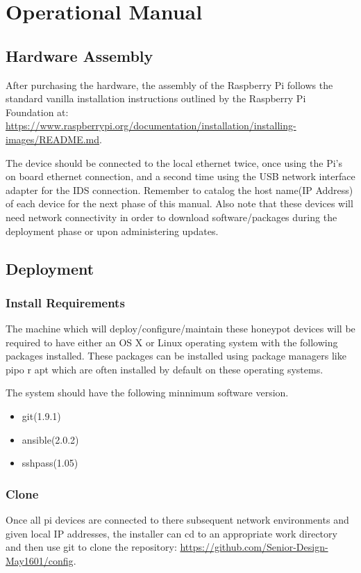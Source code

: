 \chapter{Operational Manual}

\section{Hardware Assembly}

After purchasing the hardware, the assembly of the Raspberry Pi follows the standard vanilla installation instructions outlined by the Raspberry Pi Foundation at: \url{https://www.raspberrypi.org/documentation/installation/installing-images/README.md}.


The device should be connected to the local ethernet twice, once using the Pi's on board ethernet connection, and a second time using the USB network interface adapter for the IDS connection. Remember to catalog the host name(IP Address) of each device for the next phase of this manual. Also note that these devices will need network connectivity in order to download software/packages during the deployment phase or upon administering updates.

\section{Deployment}
\subsection{Install Requirements}
The machine which will deploy/configure/maintain these honeypot devices will be required to have either an OS X or Linux operating system with the following packages installed. These packages can be installed using package managers like pipo r apt which are often installed by default on these operating systems. 

The system should have the following minnimum software version.
\begin{itemize}
\item git(1.9.1)
\item ansible(2.0.2)
\item sshpass(1.05)
\end{itemize}

\subsection{Clone}
Once all pi devices are connected to there subsequent network environments and given local IP addresses, the installer can cd to an appropriate work directory and then use git to clone the repository: \url{https://github.com/Senior-Design-May1601/config}.

